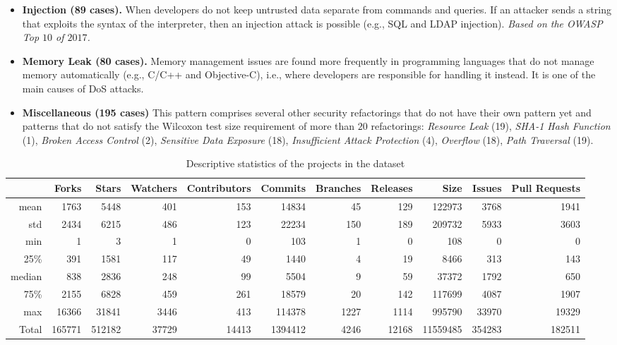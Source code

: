 \documentclass[sigconf,review]{acmart}
\begin{document}
\begin{itemize}
    \item \textbf{Injection (89 cases).} When developers do not keep untrusted data
    separate from commands and queries. If an attacker sends a string that
    exploits the syntax of the interpreter, then an injection attack is possible
    (e.g., SQL and LDAP injection). \textit{Based on the OWASP Top $10$ of
    $2017$.}

    \item \textbf{Memory Leak (80 cases).} Memory management issues are found more frequently
	in programming languages that do not manage memory automatically (e.g., C/C++
    and Objective-C), i.e., where developers are responsible for
    handling it instead. It is one of the main causes of DoS attacks.

    \item \textbf{Miscellaneous (195 cases)} This pattern comprises
	several other security refactorings that do not have their own pattern yet and patterns that
	do not satisfy the Wilcoxon test size requirement of more than $20$ refactorings:
    \textit{Resource Leak} (19), \textit{SHA-1 Hash Function} (1),
    \textit{Broken Access Control} (2), \textit{Sensitive Data Exposure} (18),
    \textit{Insufficient Attack Protection} (4), \textit{Overflow} (18),
    \textit{Path Traversal} (19). \end{itemize}

\begin{table}[h]
	\centering
	\caption{Descriptive statistics of the projects in the dataset}
\begin{tabular}{@{}rrrrrrrrrrr@{}}
\toprule
      & Forks   & Stars   & Watchers & Contributors & Commits  & Branches & Releases & Size      & Issues & Pull Requests  \\ \midrule
mean  & 1763 & 5448 & 401   & 153       & 14834 & 45    & 129   & 122973 & 3768   & 1941 \\
std   & 2434 & 6215 & 486   & 123       & 22234 & 150   & 189   & 209732 & 5933   & 3603 \\
min   & 1       & 3       & 1        & 0            & 103      & 1        & 0        & 108       & 0         & 0       \\
25\%  & 391  & 1581    & 117   & 49           & 1440  & 4        & 19       & 8466   & 313    & 143  \\
median  & 838  & 2836 & 248      & 99           & 5504  & 9        & 59       & 37372  & 1792   & 650     \\
75\%  & 2155    & 6828 & 459   & 261          & 18579 & 20       & 142   & 117699 & 4087   & 1907 \\
max   & 16366   & 31841   & 3446     & 413          & 114378   & 1227     & 1114     & 995790    & 33970     & 19329   \\
Total & 165771  & 512182  & 37729    & 14413        & 1394412  & 4246     & 12168    & 11559485  & 354283    & 182511  \\ \bottomrule
\end{tabular}
\vspace{-0.3cm}
\label{tab:dataset}
\end{table}
\end{document}
